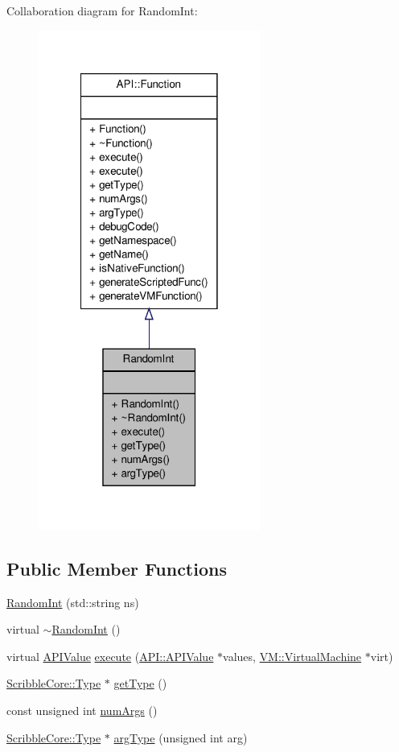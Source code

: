 Collaboration diagram for Random\-Int\-:
\nopagebreak
\begin{figure}[H]
\begin{center}
\leavevmode
\includegraphics[width=206pt]{class_random_int__coll__graph}
\end{center}
\end{figure}
\subsection*{Public Member Functions}
\begin{DoxyCompactItemize}
\item 
\hyperlink{class_random_int_ab8956bd2784b585ec8c1575ba77dc4a7}{Random\-Int} (std\-::string ns)
\item 
virtual \hyperlink{class_random_int_a826ae66ce1ac48a7b30d1a676a9112e8}{$\sim$\-Random\-Int} ()
\item 
virtual \hyperlink{class_a_p_i_1_1_a_p_i_value}{A\-P\-I\-Value} \hyperlink{class_random_int_a781d73f929b3a12c5d1cda04e8bf043c}{execute} (\hyperlink{class_a_p_i_1_1_a_p_i_value}{A\-P\-I\-::\-A\-P\-I\-Value} $\ast$values, \hyperlink{class_v_m_1_1_virtual_machine}{V\-M\-::\-Virtual\-Machine} $\ast$virt)
\item 
\hyperlink{class_scribble_core_1_1_type}{Scribble\-Core\-::\-Type} $\ast$ \hyperlink{class_random_int_a8a8d93f6faf6d6b402375c0e4ba6bf7b}{get\-Type} ()
\item 
const unsigned int \hyperlink{class_random_int_a10512d2cd058a3f46978511d0722a297}{num\-Args} ()
\item 
\hyperlink{class_scribble_core_1_1_type}{Scribble\-Core\-::\-Type} $\ast$ \hyperlink{class_random_int_a49bb03bdbbfbe5c799017643e53f9d2f}{arg\-Type} (unsigned int arg)
\end{DoxyCompactItemize}
